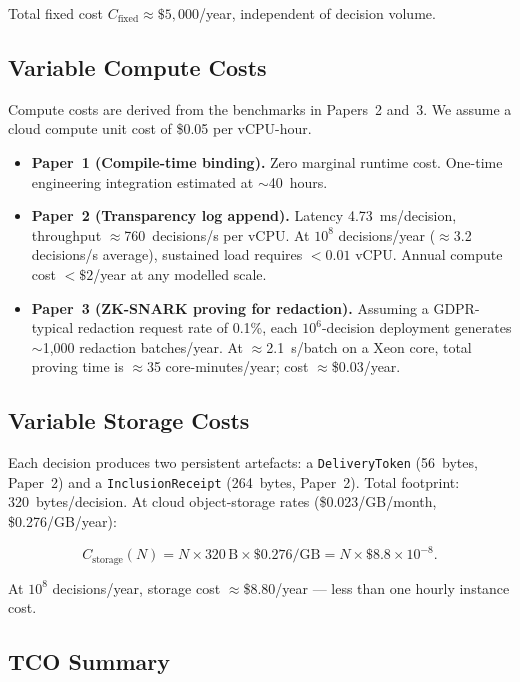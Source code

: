 \noindent Total fixed cost $C_{\text{fixed}} \approx \$5{,}000$/year,
independent of decision volume.

\subsection{Variable Compute Costs}
\label{subsec:compute}

Compute costs are derived from the benchmarks in Papers~2 and~3.
We assume a cloud compute unit cost of \$0.05 per vCPU-hour.

\begin{itemize}
  \item \textbf{Paper~1 (Compile-time binding).} Zero marginal runtime
  cost. One-time engineering integration estimated at $\sim$40~hours.

  \item \textbf{Paper~2 (Transparency log append).} Latency
  4.73~ms/decision, throughput $\approx$760~decisions/s per vCPU.
  At $10^8$ decisions/year ($\approx$3.2 decisions/s average),
  sustained load requires $< 0.01$ vCPU. Annual compute cost
  $< \$2$/year at any modelled scale.

  \item \textbf{Paper~3 (ZK-SNARK proving for redaction).} Assuming a
  GDPR-typical redaction request rate of 0.1\%, each $10^6$-decision
  deployment generates $\sim$1{,}000 redaction batches/year. At
  $\approx$2.1~s/batch on a Xeon core, total proving time is
  $\approx$35 core-minutes/year; cost $\approx$\$0.03/year.
\end{itemize}

\subsection{Variable Storage Costs}
\label{subsec:storage}

Each decision produces two persistent artefacts: a \texttt{DeliveryToken}
(56~bytes, Paper~2) and a \texttt{InclusionReceipt} (264~bytes, Paper~2).
Total footprint: 320~bytes/decision. At cloud object-storage rates
(\$0.023/GB/month, \$0.276/GB/year):

\[
  C_{\text{storage}}(N) = N \times 320\,\text{B} \times \$0.276/\text{GB}
  = N \times \$8.8 \times 10^{-8}.
\]

At $10^8$ decisions/year, storage cost $\approx$\$8.80/year --- less than
one hourly instance cost.

\subsection{TCO Summary}
\label{subsec:tco-summary}

